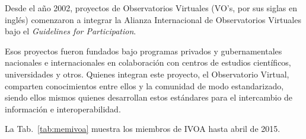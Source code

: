 Desde el año 2002, proyectos de Observatorios Virtuales (VO’s, por sus siglas en ingl\'es) comenzaron a integrar la Alianza Internacional de Observatorios Virtuales bajo el \emph{Guidelines for Participation}\footnotemark{}.


Esos proyectos fueron fundados bajo programas privados y gubernamentales nacionales e internacionales en colaboración con centros de estudios científicos, universidades y otros. Quienes integran este proyecto, el Observatorio Virtual, comparten conocimientos entre ellos y la comunidad de modo estandarizado, siendo ellos mismos quienes desarrollan estos estándares para el intercambio de información e interoperabilidad.

La Tab.~\ref{tab:memivoa} muestra los miembros de IVOA hasta abril de 2015\footnotemark.


